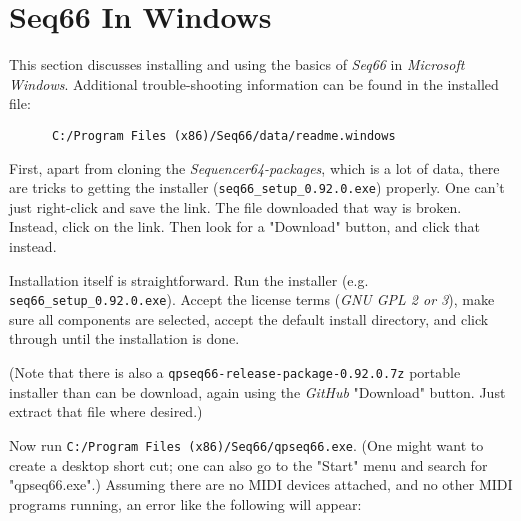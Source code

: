 %
%
%

\section{Seq66 In Windows}
\label{sec:windows}

   This section discusses installing and using the basics of \textsl{Seq66}
   in \textsl{Microsoft Windows}.  Additional trouble-shooting information can be
   found in the installed file:

   \begin{verbatim}
      C:/Program Files (x86)/Seq66/data/readme.windows
   \end{verbatim}

   First, apart from cloning the \textsl{Sequencer64-packages}, which is a lot
   of data, there are tricks to getting the installer
   (\texttt{seq66\_setup\_0.92.0.exe}) properly. 
   One can't just right-click and save the link.
   The file downloaded that way is broken.
   Instead, click on the link.  Then look for a "Download" button, and
   click that instead.

   Installation itself is straightforward.  Run the installer (e.g.
   \texttt{seq66\_setup\_0.92.0.exe}).  Accept the license terms (\textsl{GNU
   GPL 2 or 3}), make sure all components are selected, accept the default
   install directory, and click through until the installation is done.

   (Note that there is also a
   \texttt{qpseq66-release-package-0.92.0.7z} portable installer
   than can be download, again using the \textsl{GitHub} "Download" button.
   Just extract that file where desired.)

   Now run 
   \texttt{C:/Program Files (x86)/Seq66/qpseq66.exe}.
   (One might want to create a desktop short cut; one can also go to the
   "Start" menu and search for "qpseq66.exe".)
   Assuming there are no MIDI devices attached, and no other MIDI programs
   running, an error like the following will appear:


